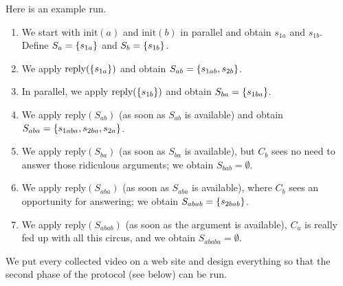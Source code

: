 \documentclass[version=3.21, pagesize, twoside=off, bibliography=totoc, DIV=calc, fontsize=12pt, a4paper]{scrartcl}
\begin{document}
\begin{example}
Here is an example run.
\begin{enumerate}
	\item We start with $\text{init}(a)$ and $\text{init}(b)$ in parallel and obtain $s_{1a}$ and $s_{1b}$. Define $S_{a} = \{s_{1a}\}$ and $S_{b} = \{s_{1b}\}$.
	\item We apply $\text{reply}(\{s_{1a}\})$ and obtain $S_{ab} = \{s_{1ab}, s_{2b}\}$.
	\item In parallel, we apply $\text{reply}(\{s_{1b}\})$ and obtain $S_{ba} = \{s_{1ba}\}$.
	\item We apply $\text{reply}(S_{ab})$ (as soon as $S_{ab}$ is available) and obtain $S_{aba} = \{s_{1aba}, s_{2ba}, s_{2a}\}$.
	\item We apply $\text{reply}(S_{ba})$ (as soon as $S_{ba}$ is available), but $C_b$ sees no need to answer those ridiculous arguments; we obtain $S_{bab} = \emptyset$.
	\item We apply $\text{reply}(S_{aba})$ (as soon as $S_{aba}$ is available), where $C_b$ sees an opportunity for answering; we obtain $S_{abab} = \{s_{2bab}\}$.
	\item We apply $\text{reply}(S_{abab})$ (as soon as the argument is available), $C_a$ is really fed up with all this circus, and we obtain $S_{ababa} = \emptyset$.
\end{enumerate}
\end{example}
We put every collected video on a web site and design everything so that the second phase of the protocol (see below) can be run.
\end{document}
